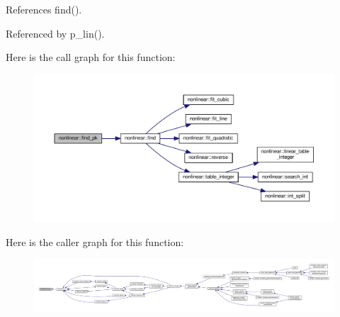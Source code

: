 References find().



Referenced by p\+\_\+lin().

Here is the call graph for this function\+:
\nopagebreak
\begin{figure}[H]
\begin{center}
\leavevmode
\includegraphics[width=350pt]{namespacenonlinear_ad7792185b1262569016446c4cba41606_cgraph}
\end{center}
\end{figure}
Here is the caller graph for this function\+:
\nopagebreak
\begin{figure}[H]
\begin{center}
\leavevmode
\includegraphics[width=350pt]{namespacenonlinear_ad7792185b1262569016446c4cba41606_icgraph}
\end{center}
\end{figure}
\mbox{\label{namespacenonlinear_ad34b8f5e3284fe90bf1e2d39ad027cc1}} 
